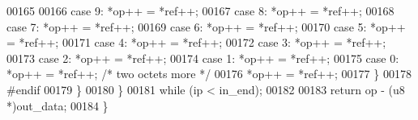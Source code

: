 \begin{DoxyCode}
00165 
00166               \textcolor{keywordflow}{case} 9: *op++ = *ref++;
00167               \textcolor{keywordflow}{case} 8: *op++ = *ref++;
00168               \textcolor{keywordflow}{case} 7: *op++ = *ref++;
00169               \textcolor{keywordflow}{case} 6: *op++ = *ref++;
00170               \textcolor{keywordflow}{case} 5: *op++ = *ref++;
00171               \textcolor{keywordflow}{case} 4: *op++ = *ref++;
00172               \textcolor{keywordflow}{case} 3: *op++ = *ref++;
00173               \textcolor{keywordflow}{case} 2: *op++ = *ref++;
00174               \textcolor{keywordflow}{case} 1: *op++ = *ref++;
00175               \textcolor{keywordflow}{case} 0: *op++ = *ref++; \textcolor{comment}{/* two octets more */}
00176                       *op++ = *ref++;
00177             \}
00178 \textcolor{preprocessor}{#}\textcolor{preprocessor}{endif}
00179         \}
00180     \}
00181   \textcolor{keywordflow}{while} (ip < in\_end);
00182 
00183   \textcolor{keywordflow}{return} op - (u8 *)out\_data;
00184 \}
\end{DoxyCode}
